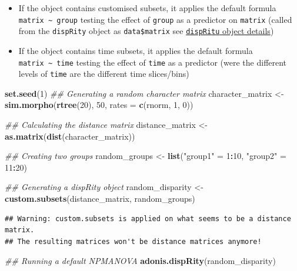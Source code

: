 \documentclass[]{book}
\newenvironment{Shaded}{\begin{snugshade}}{\end{snugshade}}
\newcommand{\CommentTok}[1]{\textcolor[rgb]{0.56,0.35,0.01}{\textit{#1}}}
\newcommand{\DataTypeTok}[1]{\textcolor[rgb]{0.13,0.29,0.53}{#1}}
\newcommand{\DecValTok}[1]{\textcolor[rgb]{0.00,0.00,0.81}{#1}}
\newcommand{\KeywordTok}[1]{\textcolor[rgb]{0.13,0.29,0.53}{\textbf{#1}}}
\newcommand{\NormalTok}[1]{#1}
\newcommand{\OperatorTok}[1]{\textcolor[rgb]{0.81,0.36,0.00}{\textbf{#1}}}
\newcommand{\StringTok}[1]{\textcolor[rgb]{0.31,0.60,0.02}{#1}}
\providecommand{\tightlist}{%
  \setlength{\itemsep}{0pt}\setlength{\parskip}{0pt}}
\begin{document}
\begin{itemize}
\tightlist
\item
  If the object contains customised subsets, it applies the default formula \texttt{matrix\ \textasciitilde{}~group} testing the effect of \texttt{group} as a predictor on \texttt{matrix} (called from the \texttt{dispRity} object as \texttt{data\$matrix} see \protect\hyperlink{The-dispRity-object-content}{\texttt{dispRitu} object details})
\item
  If the object contains time subsets, it applies the default formula \texttt{matrix\ \textasciitilde{}\ time} testing the effect of \texttt{time} as a predictor (were the different levels of \texttt{time} are the different time slices/bins)
\end{itemize}

\begin{Shaded}
\begin{Highlighting}[]
\KeywordTok{set.seed}\NormalTok{(}\DecValTok{1}\NormalTok{)}
\CommentTok{## Generating a random character matrix}
\NormalTok{character_matrix <-}\StringTok{ }\KeywordTok{sim.morpho}\NormalTok{(}\KeywordTok{rtree}\NormalTok{(}\DecValTok{20}\NormalTok{), }\DecValTok{50}\NormalTok{,}
                               \DataTypeTok{rates =} \KeywordTok{c}\NormalTok{(rnorm, }\DecValTok{1}\NormalTok{, }\DecValTok{0}\NormalTok{))}

\CommentTok{## Calculating the distance matrix}
\NormalTok{distance_matrix <-}\StringTok{ }\KeywordTok{as.matrix}\NormalTok{(}\KeywordTok{dist}\NormalTok{(character_matrix))}

\CommentTok{## Creating two groups}
\NormalTok{random_groups <-}\StringTok{ }\KeywordTok{list}\NormalTok{(}\StringTok{"group1"}\NormalTok{ =}\StringTok{ }\DecValTok{1}\OperatorTok{:}\DecValTok{10}\NormalTok{, }\StringTok{"group2"}\NormalTok{ =}\StringTok{ }\DecValTok{11}\OperatorTok{:}\DecValTok{20}\NormalTok{)}

\CommentTok{## Generating a dispRity object}
\NormalTok{random_disparity <-}\StringTok{ }\KeywordTok{custom.subsets}\NormalTok{(distance_matrix, random_groups)}
\end{Highlighting}
\end{Shaded}

\begin{verbatim}
## Warning: custom.subsets is applied on what seems to be a distance matrix.
## The resulting matrices won't be distance matrices anymore!
\end{verbatim}

\begin{Shaded}
\begin{Highlighting}[]
\CommentTok{## Running a default NPMANOVA}
\KeywordTok{adonis.dispRity}\NormalTok{(random_disparity)}
\end{Highlighting}
\end{Shaded}
\end{document}
